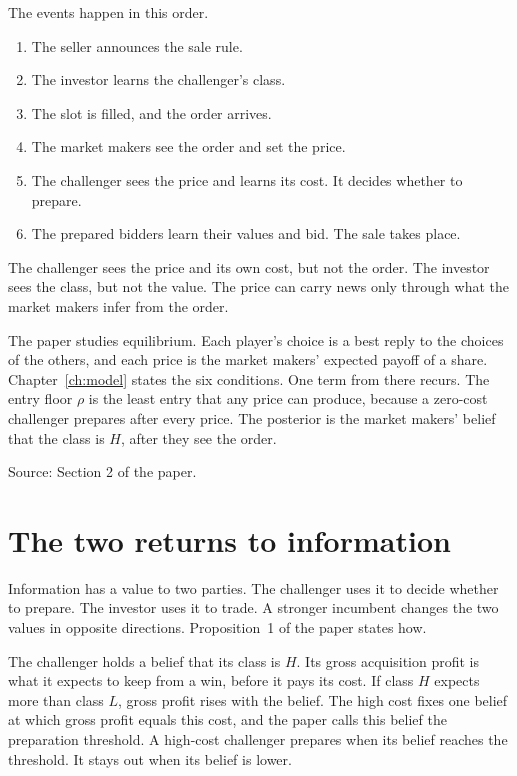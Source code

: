 The events happen in this order.
\begin{enumerate}[nosep]
\item The seller announces the sale rule.
\item The investor learns the challenger's class.
\item The slot is filled, and the order arrives.
\item The market makers see the order and set the price.
\item The challenger sees the price and learns its cost. It decides whether to prepare.
\item The prepared bidders learn their values and bid. The sale takes place.
\end{enumerate}

\begin{watchout}
The challenger sees the price and its own cost, but not the order. The investor sees the class, but not the value. The price can carry news only through what the market makers infer from the order.
\end{watchout}

The paper studies equilibrium. Each player's choice is a best reply to the choices of the others, and each price is the market makers' expected payoff of a share. Chapter~\ref{ch:model} states the six conditions. One term from there recurs. The entry floor \(\rho\) is the least entry that any price can produce, because a zero-cost challenger prepares after every price. The posterior is the market makers' belief that the class is \(H\), after they see the order.

{\small\color{notegrey}Source: Section 2 of the paper.}

\section{The two returns to information}\label{sec:story-returns}

Information has a value to two parties. The challenger uses it to decide whether to prepare. The investor uses it to trade. A stronger incumbent changes the two values in opposite directions. Proposition~1 of the paper states how.

The challenger holds a belief that its class is \(H\). Its gross acquisition profit is what it expects to keep from a win, before it pays its cost. If class \(H\) expects more than class \(L\), gross profit rises with the belief. The high cost fixes one belief at which gross profit equals this cost, and the paper calls this belief the preparation threshold. A high-cost challenger prepares when its belief reaches the threshold. It stays out when its belief is lower.

